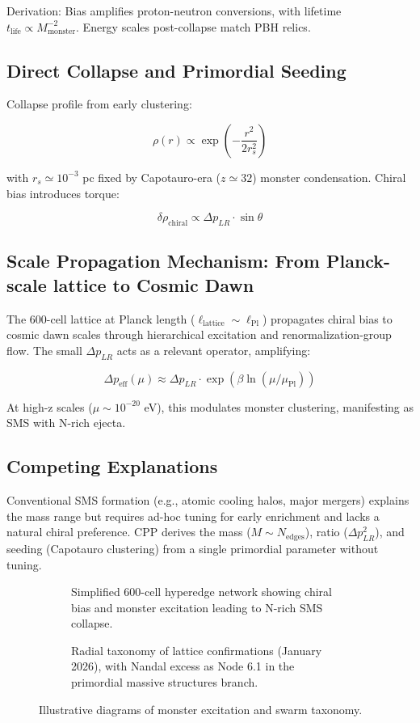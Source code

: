 \documentclass[11pt]{article}
\begin{document}
Derivation: Bias amplifies proton-neutron conversions, with lifetime $t_{\text{life}} \propto M_{\text{monster}}^{-2}$. Energy scales post-collapse match PBH relics.

\subsection{Direct Collapse and Primordial Seeding}
Collapse profile from early clustering:

\[
\rho(r) \propto \exp\left( -\frac{r^2}{2 r_s^2} \right)
\]

with $r_s \simeq 10^{-3}$ pc fixed by Capotauro-era ($z \simeq 32$) monster condensation. Chiral bias introduces torque:

\[
\delta \rho_{\text{chiral}} \propto \Delta p_{LR} \cdot \sin\theta
\]

\subsection{Scale Propagation Mechanism: From Planck-scale lattice to Cosmic Dawn}
The 600-cell lattice at Planck length ($\ell_{\text{lattice}} \sim \ell_{\text{Pl}}$) propagates chiral bias to cosmic dawn scales through hierarchical excitation and renormalization-group flow. The small $\Delta p_{LR}$ acts as a relevant operator, amplifying:

\[
\Delta p_{\text{eff}}(\mu) \approx \Delta p_{LR} \cdot \exp(\beta \ln(\mu / \mu_{\text{Pl}}))
\]

At high-z scales ($\mu \sim 10^{-20}$ eV), this modulates monster clustering, manifesting as SMS with N-rich ejecta.

\subsection{Competing Explanations}
Conventional SMS formation (e.g., atomic cooling halos, major mergers) explains the mass range but requires ad-hoc tuning for early enrichment and lacks a natural chiral preference. CPP derives the mass ($M \sim N_{\text{edges}}$), ratio ($\Delta p_{LR}^2$), and seeding (Capotauro clustering) from a single primordial parameter without tuning.

\begin{figure}[htbp]
\centering
\begin{subfigure}{0.45\textwidth}
\centering
\caption{Simplified 600-cell hyperedge network showing chiral bias and monster excitation leading to N-rich SMS collapse.}
\label{fig:monster-exc}
\end{subfigure}
\hfill
\begin{subfigure}{0.45\textwidth}
\centering
\caption{Radial taxonomy of lattice confirmations (January 2026), with Nandal excess as Node 6.1 in the primordial massive structures branch.}
\label{fig:taxonomy}
\end{subfigure}
\caption{Illustrative diagrams of monster excitation and swarm taxonomy.}
\end{figure}
\end{document}
